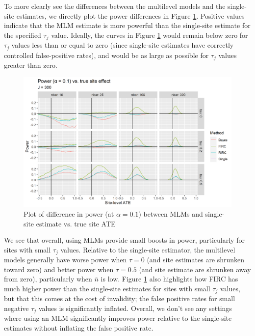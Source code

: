 \documentclass[]{article}
\begin{document}
To more clearly see the differences between the multilevel models and the single-site estimates, we directly plot the power differences in Figure \ref{fig:power_plot_diff}.
Positive values indicate that the MLM estimate is more powerful than the single-site estimate for the specified $\tau_j$ value.
Ideally, the curves in Figure \ref{fig:power_plot_diff} would remain below zero for $\tau_j$ values less than or equal to zero (since single-site estimates have correctly controlled false-positive rates), and would be as large as possible for $\tau_j$ values greater than zero.

\begin{figure}[ht]
	\centering
	\includegraphics[width=\textwidth]{power_plot_J300_diff}
	\caption{Plot of difference in power (at $\alpha = 0.1$) between MLMs and single-site estimate vs. true site ATE}
	\label{fig:power_plot_diff}
\end{figure}

We see that overall, using MLMs provide small boosts in power, particularly for sites with small $\tau_j$ values.
Relative to the single-site estimator, the multilevel models generally have worse power when $\tau=0$ (and site estimates are shrunken toward zero) and better power when $\tau=0.5$ (and site estimate are shrunken away from zero), particularly when $\bar{n}$ is low.
Figure \ref{fig:power_plot_diff} also highlights how FIRC has much higher power than the single-site estimates for sites with small $\tau_j$ values, but that this comes at the cost of invalidity; the false positive rates for small negative $\tau_j$ values is significantly inflated.
Overall, we don't see any settings where using an MLM significantly improves power relative to the single-site estimates without inflating the false positive rate.
\end{document}
